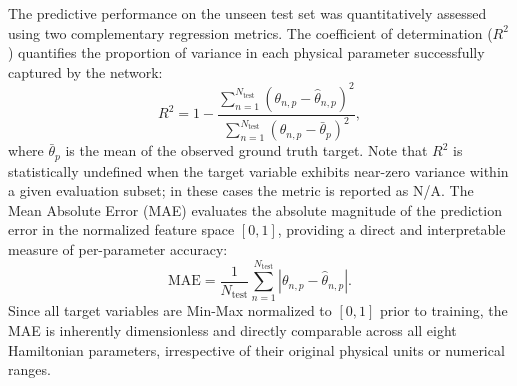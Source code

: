 \documentclass[final,5p,times,twocolumn]{elsarticle}
\begin{document}
The predictive performance on the unseen test set 
was quantitatively assessed using two complementary 
regression metrics. The coefficient of determination 
($R^2$) quantifies the proportion of variance in 
each physical parameter successfully captured by 
the network:
%
\begin{equation}\label{eq:R2}
R^2 = 1 - \frac{\sum_{n=1}^{N_{\text{test}}} 
\left(\theta_{n,p} - \hat{\theta}_{n,p}\right)^2}
{\sum_{n=1}^{N_{\text{test}}} 
\left(\theta_{n,p} - \bar{\theta}_p\right)^2},
\end{equation}
%
where $\bar{\theta}_p$ is the mean of the observed 
ground truth target. Note that $R^2$ is statistically 
undefined when the target variable exhibits near-zero 
variance within a given evaluation subset; in these 
cases the metric is reported as N/A. The Mean Absolute 
Error (MAE) evaluates the absolute magnitude of the 
prediction error in the normalized feature space 
$[0,1]$, providing a direct and interpretable measure 
of per-parameter accuracy:
%
\begin{equation}\label{eq:MAE}
\text{MAE} = \frac{1}{N_{\text{test}}} 
\sum_{n=1}^{N_{\text{test}}} 
\left|\theta_{n,p} - \hat{\theta}_{n,p}\right|.
\end{equation}
%
Since all target variables are Min-Max normalized 
to $[0,1]$ prior to training, the MAE is inherently 
dimensionless and directly comparable across all 
eight Hamiltonian parameters, irrespective of their 
original physical units or numerical ranges.
\end{document}
